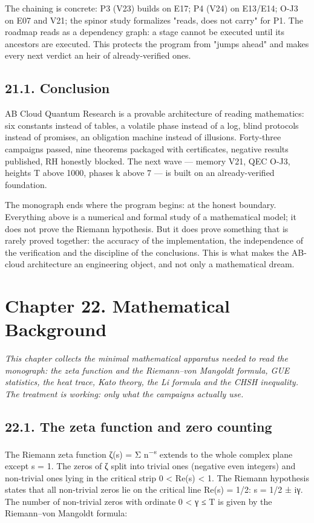 \documentclass[11pt,a4paper]{article}
\begin{document}
The chaining is concrete: P3 (V23) builds on E17; P4 (V24) on E13/E14; O-J3 on E07 and V21; the spinor study formalizes "reads, does not carry" for P1. The roadmap reads as a dependency graph: a stage cannot be executed until its ancestors are executed. This protects the program from "jumps ahead" and makes every next verdict an heir of already-verified ones.

\subsection{21.1. Conclusion}

AB Cloud Quantum Research is a provable architecture of reading mathematics: six constants instead of tables, a volatile phase instead of a log, blind protocols instead of promises, an obligation machine instead of illusions. Forty-three campaigns passed, nine theorems packaged with certificates, negative results published, RH honestly blocked. The next wave — memory V21, QEC O-J3, heights T above 1000, phases k above 7 — is built on an already-verified foundation.

The monograph ends where the program begins: at the honest boundary. Everything above is a numerical and formal study of a mathematical model; it does not prove the Riemann hypothesis. But it does prove something that is rarely proved together: the accuracy of the implementation, the independence of the verification and the discipline of the conclusions. This is what makes the AB-cloud architecture an engineering object, and not only a mathematical dream.

\section{Chapter 22. Mathematical Background}

\noindent\textit{\color{copper}This chapter collects the minimal mathematical apparatus needed to read the monograph: the zeta function and the Riemann–von Mangoldt formula, GUE statistics, the heat trace, Kato theory, the Li formula and the CHSH inequality. The treatment is working: only what the campaigns actually use.}

\subsection{22.1. The zeta function and zero counting}

The Riemann zeta function ζ(s) = Σ n\textsuperscript{−s} extends to the whole complex plane except s = 1. The zeros of ζ split into trivial ones (negative even integers) and non-trivial ones lying in the critical strip 0 < Re(s) < 1. The Riemann hypothesis states that all non-trivial zeros lie on the critical line Re(s) = 1/2: s = 1/2 ± iγ. The number of non-trivial zeros with ordinate 0 < γ ≤ T is given by the Riemann–von Mangoldt formula:
\end{document}
